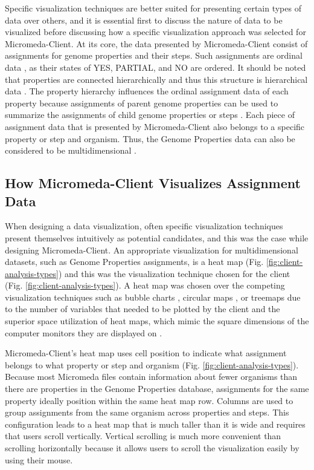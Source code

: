 Specific visualization techniques are better suited for presenting certain types 
of data over others, and it is essential first to discuss the nature of data to 
be visualized before discussing how a specific visualization approach was 
selected for Micromeda-Client. At its core, the data presented by 
Micromeda-Client consist of assignments for genome properties and their steps. 
Such assignments are ordinal data 
\cite{richardson2018genome,agresti2010analysis}, as their states of YES, 
PARTIAL, and NO are ordered. It should be noted that properties are connected 
hierarchically \cite{richardson2018genome} and thus this structure is 
hierarchical data \cite{richardson2018genome,samet1990applications}. The 
property hierarchy influences the ordinal assignment data of each property 
because assignments of parent genome properties can be used to summarize the 
assignments of child genome properties or steps \cite{richardson2018genome}. 
Each piece of assignment data that is presented by Micromeda-Client also belongs 
to a specific property or step and organism. Thus, the Genome Properties data 
can also be considered to be multidimensional 
\cite{pedersen1999multidimensional}.

\subsection{How Micromeda-Client Visualizes Assignment Data}

When designing a data visualization, often specific visualization techniques 
present themselves intuitively as potential candidates, and this was the case 
while designing Micromeda-Client. An appropriate visualization for 
multidimensional datasets, such as Genome Properties assignments, is a heat map 
\cite{wilkinson2009history,tufte2001visual}(Fig. 
\ref{fig:client-analysis-types}) and this was the visualization technique chosen 
for the client (Fig. \ref{fig:client-analysis-types}). A heat map was chosen 
over the competing visualization techniques such as bubble charts 
\cite{tufte2001visual}, circular maps 
\cite{ward2002taxonomy,stothard2004circular}, or treemaps 
\cite{shneiderman1998tree} due to the number of variables that needed to be 
plotted by the client and the superior space utilization of heat maps, which 
mimic the square dimensions of the computer monitors they are displayed on \cite{muramalla2017radial}.

Micromeda-Client's heat map uses cell position to indicate what assignment 
belongs to what property or step and organism (Fig. 
\ref{fig:client-analysis-types}). Because most Micromeda files contain 
information about fewer organisms than there are properties in the Genome 
Properties database, assignments for the same property ideally position within 
the same heat map row. Columns are used to group assignments from the same 
organism across properties and steps. This configuration leads to a heat map 
that is much taller than it is wide and requires that users scroll vertically. 
Vertical scrolling is much more convenient than scrolling horizontally because 
it allows users to scroll the visualization easily by using their mouse.

